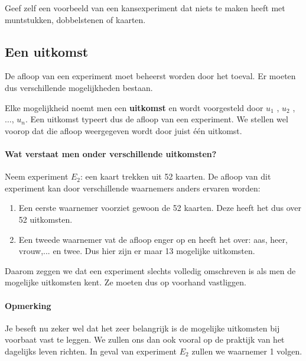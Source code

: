 \documentclass[12pt,a4paper,twoside]{article}
\begin{document}
\begin{oefening}
Geef zelf een voorbeeld van een kansexperiment dat niets te maken heeft met muntstukken, dobbelstenen of kaarten.
\end{oefening}

\subsection{Een uitkomst}

De afloop van een experiment moet beheerst worden door het toeval. Er moeten dus verschillende mogelijkheden bestaan.

Elke mogelijkheid noemt men een {\bf uitkomst} en wordt voorgesteld door $u_1$ , $u_2$ , $\ldots$, $u_n$. Een uitkomst typeert dus de afloop van een experiment. We stellen wel voorop dat die afloop weergegeven wordt door juist één uitkomst.

\paragraph*{Wat verstaat men onder verschillende uitkomsten?}

Neem experiment $E_2$: een kaart trekken uit 52 kaarten. De afloop van dit experiment
kan door verschillende waarnemers anders ervaren worden:
\begin{enumerate}
  \item Een eerste waarnemer voorziet gewoon de 52 kaarten. Deze heeft het dus over 52 uitkomsten.
  \item Een tweede waarnemer vat de afloop enger op en heeft het over: aas, heer, vrouw,... en twee. Dus hier zijn er maar 13 mogelijke uitkomsten.
\end{enumerate}

Daarom zeggen we dat een experiment slechts volledig omschreven is als men de mogelijke uitkomsten kent. Ze moeten dus op voorhand vastliggen.

\paragraph*{Opmerking}
Je beseft nu zeker wel dat het zeer belangrijk is de mogelijke uitkomsten bij
voorbaat vast te leggen. We zullen ons dan ook vooral op de praktijk van het dagelijks
leven richten. In geval van experiment $E_2$ zullen we waarnemer 1 volgen.
\end{document}
